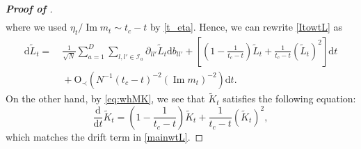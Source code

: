 \documentclass[10pt,reqno]{amsart}
\numberwithin{equation}{section}
\numberwithin{figure}{section}
\theoremstyle{plain} %
\theoremstyle{definition} %
\newcommand{\wt}{\widetilde}
\newcommand{\dd}{\mathrm{d}}
\newcommand{\pa}[1]{\left({#1}\right)}
\DeclareMathOperator{\im}{\mathrm{Im}}
\newcommand{\be}{\begin{equation}}
\newcommand{\ee}{\end{equation}}
\newcommand{\OO}{\mathrm{O}}
\newcommand{\kk}{l'}
\numberwithin{equation}{section}
\begin{document}
\begin{proof}[\bf Proof of ]
\begin{equation}
\begin{aligned}
    \end{aligned}
\end{equation}
where we used $\eta_t/\im m_t\sim t_c-t$ by \eqref{t_eta}. Hence, we can rewrite \eqref{ItowtL} as 
\be\label{mainwtL}
\begin{aligned}
\dd  \widetilde{L}_{t }
=&~ \frac{1}{\sqrt{N}} \sum_{a=1}^D \sum_{ l,\kk \in \mathcal{I}_a} \partial_{ l\kk} \widetilde{L}_{t } \dd  b_{ l\kk} +\left[  \left(1 - \frac{1}{t_c-t}\right) \widetilde{L}_{t} + \frac{1}{t_c-t} (\widetilde{L}_{t })^2   \right] \dd  t\\
&~ +\OO_\prec\left(N^{-1}(t_c-t)^{-2}\pa{\im m_t}^{-2}\right)\dd t .
\end{aligned}
\ee
On the other hand, by \eqref{eq:whMK}, we see that $\wt K_t$ satisfies the following equation:
\be\label{mainwtK}
\frac{\dd}{\dd t} \wt K_t= \left(1 - \frac{1}{t_c-t}\right) \widetilde{K}_{t} + \frac{1}{t_c-t} (\widetilde{K}_{t })^2, 
\ee
 which matches the drift term in \eqref{mainwtL}.


\end{proof}
\end{document}
